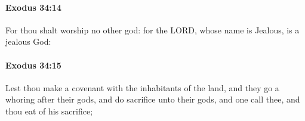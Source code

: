 		\paragraph{Exodus 34:14} %
			\label{EXODUS-34-14}

			For thou shalt worship no other god: for the LORD, whose name is Jealous, is a jealous God:


		\paragraph{Exodus 34:15} %
			\label{EXODUS-34-15}

			Lest thou make a covenant with the inhabitants of the land, and they go a whoring after their gods, and do sacrifice unto their gods, and one call thee, and thou eat of his sacrifice;


